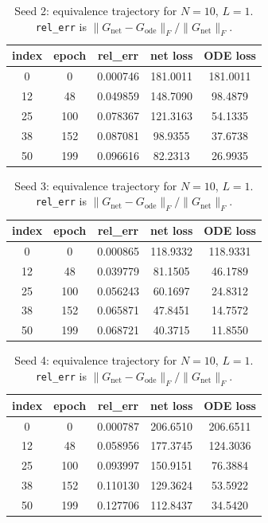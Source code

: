 \begin{table}[H]
\centering
\caption{Seed 2: equivalence trajectory for $N=10$, $L=1$. \texttt{rel\_err} is $\|G_{\mathrm{net}} - G_{\mathrm{ode}}\|_F / \|G_{\mathrm{net}}\|_F$.}
\label{tab:equiv-N10-L1-s2}
\begin{tabular}{c c c c c}
\toprule
index & epoch & rel\_err & net loss & ODE loss \\
\midrule
0 & 0 & 0.000746 & 181.0011 & 181.0011 \\
12 & 48 & 0.049859 & 148.7090 & 98.4879 \\
25 & 100 & 0.078367 & 121.3163 & 54.1335 \\
38 & 152 & 0.087081 & 98.9355 & 37.6738 \\
50 & 199 & 0.096616 & 82.2313 & 26.9935 \\
\bottomrule
\end{tabular}
\end{table}

\begin{table}[H]
\centering
\caption{Seed 3: equivalence trajectory for $N=10$, $L=1$. \texttt{rel\_err} is $\|G_{\mathrm{net}} - G_{\mathrm{ode}}\|_F / \|G_{\mathrm{net}}\|_F$.}
\label{tab:equiv-N10-L1-s3}
\begin{tabular}{c c c c c}
\toprule
index & epoch & rel\_err & net loss & ODE loss \\
\midrule
0 & 0 & 0.000865 & 118.9332 & 118.9331 \\
12 & 48 & 0.039779 & 81.1505 & 46.1789 \\
25 & 100 & 0.056243 & 60.1697 & 24.8312 \\
38 & 152 & 0.065871 & 47.8451 & 14.7572 \\
50 & 199 & 0.068721 & 40.3715 & 11.8550 \\
\bottomrule
\end{tabular}
\end{table}

\begin{table}[H]
\centering
\caption{Seed 4: equivalence trajectory for $N=10$, $L=1$. \texttt{rel\_err} is $\|G_{\mathrm{net}} - G_{\mathrm{ode}}\|_F / \|G_{\mathrm{net}}\|_F$.}
\label{tab:equiv-N10-L1-s4}
\begin{tabular}{c c c c c}
\toprule
index & epoch & rel\_err & net loss & ODE loss \\
\midrule
0 & 0 & 0.000787 & 206.6510 & 206.6511 \\
12 & 48 & 0.058956 & 177.3745 & 124.3036 \\
25 & 100 & 0.093997 & 150.9151 & 76.3884 \\
38 & 152 & 0.110130 & 129.3624 & 53.5922 \\
50 & 199 & 0.127706 & 112.8437 & 34.5420 \\
\bottomrule
\end{tabular}
\end{table}

